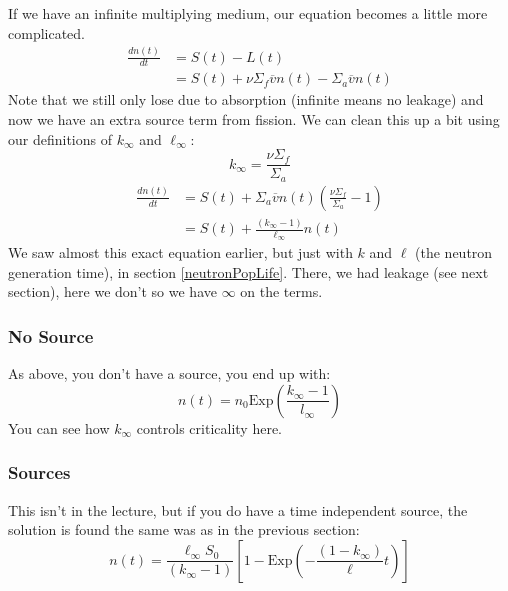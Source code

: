 \documentclass[letter]{article}
\begin{document}
\vspace{10pt}
If we have an infinite multiplying medium, our equation becomes a
little more complicated.
\begin{equation*}
  \begin{split}
        \frac{dn(t)}{dt}&=S(t)-L(t) \\
        &=S(t)+\nu\Sigma_f\overline{v}n(t)-\Sigma_a\overline{v}n(t)
  \end{split}
\end{equation*}
Note that we still only lose due to absorption (infinite means no
leakage) and now we have an extra source term from fission. We can
clean this up a bit using our definitions of $k_\infty$ and
$\ell_\infty$:
\begin{equation*}
  k_\infty=\frac{\nu\Sigma_f}{\Sigma_a}
\end{equation*}
\begin{equation*}
  \begin{split}
      \frac{dn(t)}{dt}&=S(t)+\Sigma_a\overline{v}n(t)\left(\frac{\nu\Sigma_f}{\Sigma_a}-1\right) \\
      &=S(t)+\frac{(k_\infty-1)}{\ell_\infty}n(t)
  \end{split}
\end{equation*}
We saw almost this exact equation earlier, but just with $k$ and
$\ell$ (the neutron generation time), in section
\ref{neutronPopLife}. There, we had leakage (see next section), here
we don't so we have $\infty$ on the terms.

\subsubsection{No Source}
As above, you don't have a source, you end up with:
\begin{equation*}
  n(t)=n_0\text{Exp}\left(\frac{k_\infty-1}{l_\infty}\right)
\end{equation*}
You can see how $k_\infty$ controls criticality here.
\subsubsection{Sources}
 This isn't in
the lecture, but if you do have a time independent source, the
solution is found the same was as in the previous section:
\begin{equation*}
    n(t)=\frac{\ell_\infty S_0}{(k_\infty-1)}\left[1-\text{Exp}\left(-\frac{(1-k_\infty)}{\ell}t\right)\right]
\end{equation*}
\end{document}
